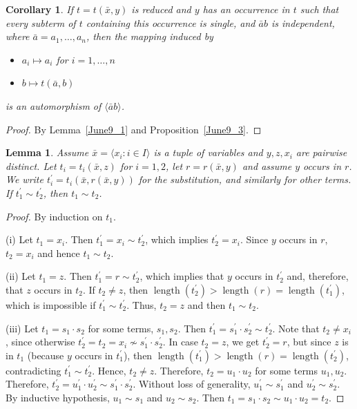 \documentclass[a4paper, 11pt]{article}
\DeclareMathOperator{\len}{length}
\theoremstyle{note}
\newtheorem{lemma}[thm]{Lemma}
\newtheorem{cor}[thm]{Corollary}
\begin{document}
	\begin{cor}\label{June9_4}  If $t= t(\bar{x},y)$  is reduced and  $y$ has an occurrence in $t$ such that every subterm of $t$ containing this occurrence is single,
		and $\bar{a}b$ is independent, where $\bar{a}=a_1,\ldots,a_n$, then the mapping induced by
		\begin{itemize}
			\item $a_i\mapsto a_i$  for $i=1,\ldots,n$
			\item $b\mapsto t(\bar{a},b)$
		\end{itemize}
		is an automorphism of  $\langle \bar{a}b\rangle$.
	\end{cor}
	\begin{proof} By Lemma~\ref{June9_1} and Proposition~\ref{June9_3}.
	\end{proof}
	


\begin{lemma}\label{March_8_23_1} Assume $\bar{x}= \langle x_i : i \in I\rangle$ is a tuple of variables and  $y,z,x_i$ are pairwise distinct. Let  $t_i=t_i(\bar{x},z)$  for $i=1,2$, let $r=r(\bar{x},y)$  and assume $y$ occurs in $r$. We write  $t_i^\prime= t_i(\bar{x},r(\bar{x},y))$  for the substitution, and similarly for other terms.  If  $t_1^\prime\sim t_2^\prime$, then  $t_1\sim t_2$.
\end{lemma}
\begin{proof} By induction on $t_1$.

(i) Let $t_1= x_i$.  Then  $t_1^\prime= x_i\sim t_2^\prime$, which implies $t_2^\prime= x_i$. Since  $y$ occurs in $r$,  $t_2= x_i$ and hence $t_1\sim t_2$.

(ii) Let  $t_1= z$.  Then $t_1^\prime = r\sim t_2^\prime$, which implies that $y$ occurs in $t_2^\prime$ and, therefore, that $z$ occurs in $t_2$.  If $t_2\neq z$, then $\len(t_2^\prime)>\len(r)=\len(t_1^\prime)$, which is impossible if $t_1^\prime\sim t_2^\prime$. Thus, $t_2= z$ and then $t_1\sim t_2$.

(iii) Let  $t_1= s_1\cdot s_2$  for some terms, $s_1,s_2$.  Then $t_1^\prime= s_1^\prime\cdot s_2^\prime\sim t_2^\prime$. Note that $t_2\neq x_i$, since otherwise $t_2^\prime= t_2=x_i\not\sim s_1^\prime\cdot s_2^\prime$. In case $t_2= z$, we get $t_2^\prime=r$, but since $z$ is in  $t_1$ (because $y$ occurs in $t_1^\prime$), then $\len(t_1^\prime)>\len(r)=\len(t_2^\prime)$, contradicting $t_1^\prime\sim t_2^\prime$. Hence, $t_2\neq z$. Therefore, $t_2= u_1\cdot u_2$  for some terms $u_1,u_2$.  Therefore, $t_2^\prime=u_1^\prime\cdot u_2^\prime\sim s_1^\prime\cdot s_2^\prime$. Without loss of generality,  $u_1^\prime\sim s_1^\prime$ and  $u_2^\prime\sim s_2^\prime$. By inductive hypothesis, $u_1\sim s_1$ and $u_2\sim s_2$.  Then $t_1= s_1\cdot s_2\sim u_1\cdot u_2 = t_2$.
\end{proof}
\end{document}
